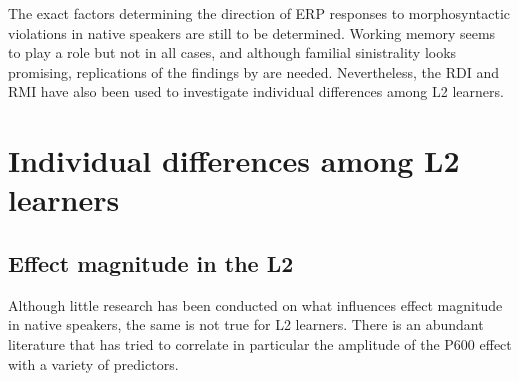 \documentclass[output=paper,colorlinks,citecolor=brown,modfonts,nonflat]{../langscibook}
\begin{document}
The exact factors determining the direction of ERP responses to morphosyntactic violations in native speakers are still to be determined. Working memory seems to play a role but not in all cases, and although familial sinistrality looks promising, replications of the findings by \citet{GreyEtAl2017} are needed. Nevertheless, the RDI and RMI have also been used to investigate individual differences among L2 learners. 

\section{Individual differences among L2 learners}
\subsection{Effect magnitude in the L2}
\largerpage

Although little research has been conducted on what influences effect magnitude in native speakers, the same is not true for L2 learners. There is an abundant literature that has tried to correlate in particular the amplitude of the P600 effect with a variety of predictors.
\end{document}
